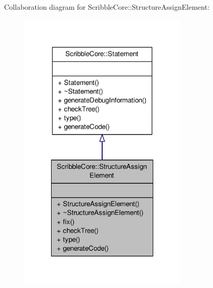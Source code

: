 Collaboration diagram for Scribble\-Core\-:\-:Structure\-Assign\-Element\-:
\nopagebreak
\begin{figure}[H]
\begin{center}
\leavevmode
\includegraphics[width=228pt]{class_scribble_core_1_1_structure_assign_element__coll__graph}
\end{center}
\end{figure}
